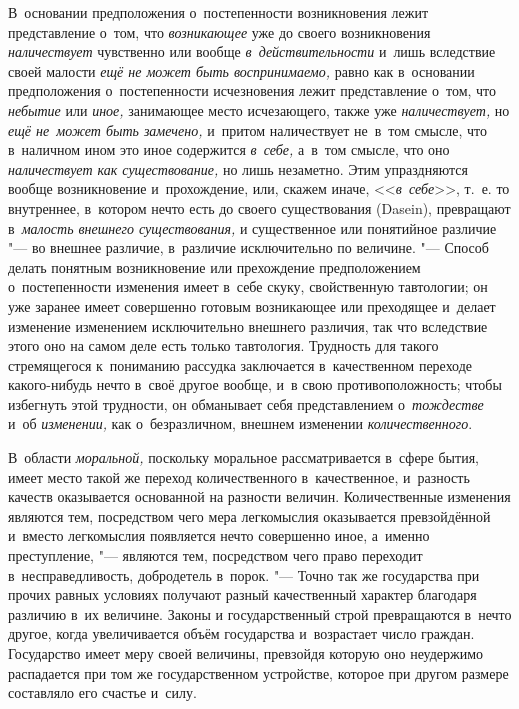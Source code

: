 В~основании предположения о~постепенности возникновения лежит представление
о~том, что {\em возникающее} уже до своего возникновения {\em наличествует}
чувственно или вообще {\em в~действительности} и~лишь вследствие своей малости
{\em ещё не может быть воспринимаемо,} равно как в~основании предположения
о~постепенности исчезновения лежит представление о~том, что {\em небытие} или
{\em иное,} занимающее место исчезающего, также уже
{\em наличествует,} но {\em ещё не~может быть замечено,} и~притом наличествует
не~в~том смысле, что в~наличном ином это иное содержится {\em в~себе,}
а~в~том смысле, что оно {\em наличествует как существование,} но лишь
незаметно. Этим упраздняются вообще возникновение и~прохождение, или, скажем
иначе, <<{\em в~себе}>>, т.~е. то внутреннее, в~котором нечто есть до своего
существования (Dasein), превращают в~{\em малость внешнего существования,} и
существенное или понятийное различие "--- во внешнее различие, в~различие
исключительно по величине. "--- Способ делать понятным возникновение или
прехождение предположением о~постепенности изменения имеет в~себе скуку,
свойственную тавтологии; он уже заранее имеет совершенно готовым возникающее
или преходящее и~делает изменение изменением исключительно внешнего различия,
так что вследствие этого оно на самом деле есть только тавтология. Трудность
для такого стремящегося к~пониманию рассудка заключается в~качественном
переходе какого-нибудь нечто в~своё другое вообще, и~в свою противоположность;
чтобы избегнуть этой трудности, он обманывает себя представлением
о~{\em тождестве} и~об {\em изменении,} как о~безразличном,
внешнем изменении {\em количественного}.

В~области {\em моральной,} поскольку моральное рассматривается в~сфере бытия,
имеет место такой же переход количественного в~качественное, и~разность качеств
оказывается основанной на разности величин. Количественные изменения являются
тем, посредством чего мера легкомыслия оказывается превзойдённой и~вместо
легкомыслия появляется нечто совершенно иное, а~именно преступление, "---
являются тем, посредством чего право переходит в~несправедливость, добродетель
в~порок. "--- Точно так же государства при прочих равных условиях получают
разный качественный характер благодаря различию в~их величине. Законы и
государственный строй превращаются в~нечто другое, когда увеличивается объём
государства и~возрастает число граждан. Государство имеет меру своей величины,
превзойдя которую оно неудержимо распадается при том же государственном
устройстве, которое при другом размере составляло его счастье и~силу.

